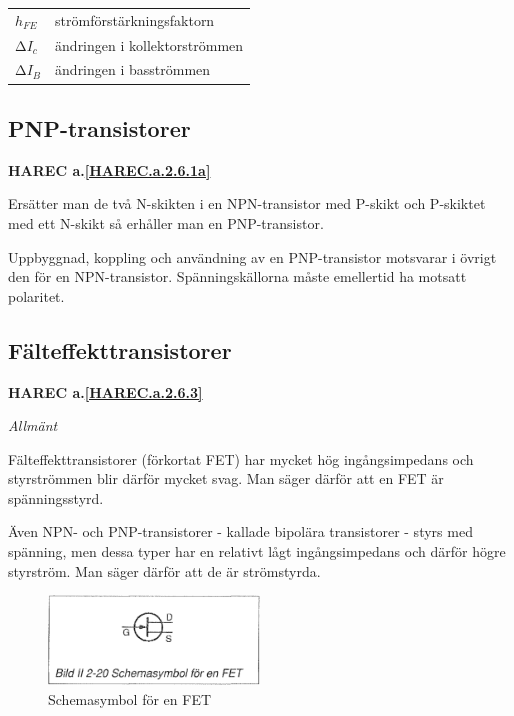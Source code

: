 \begin{tabular}{ll}
  \(h_{FE}\) & strömförstärkningsfaktorn \\
  \(∆I_c\)   & ändringen i kollektorströmmen \\
  \(∆I_B\)   & ändringen i basströmmen \\
\end{tabular}

\subsection{PNP-transistorer}
\textbf{HAREC a.\ref{HAREC.a.2.6.1a}\label{myHAREC.a.2.6.1a}}

Ersätter man de två N-skikten i en NPN-transistor med P-skikt och P-skiktet med
ett N-skikt så erhåller man en PNP-transistor.

Uppbyggnad, koppling och användning av en PNP-transistor motsvarar i övrigt den
för en NPN-transistor. Spänningskällorna måste emellertid ha motsatt polaritet.

\subsection{Fälteffekttransistorer}
\textbf{HAREC a.\ref{HAREC.a.2.6.3}\label{myHAREC.a.2.6.3}}

\emph{Allmänt}

Fälteffekttransistorer (förkortat FET) har mycket hög ingångsimpedans och
styrströmmen blir därför mycket svag. Man säger därför att en FET är
spänningsstyrd.

Även NPN- och PNP-transistorer - kallade bipolära transistorer - styrs med
spänning, men dessa typer har en relativt lågt ingångsimpedans och därför högre
styrström. Man säger därför att de är strömstyrda.

\begin{figure}
\includegraphics[width=0.5\textwidth]{images/bild_2_2-20}
\caption{Schemasymbol för en FET}
\label{fig:BildII2-20}
\end{figure}

